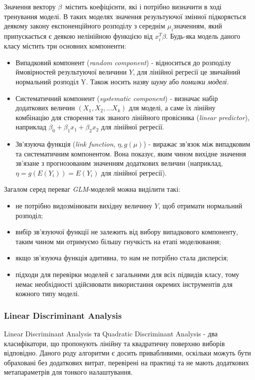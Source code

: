 Значення вектору $\beta$\ містить коефіцієнти, які і потрібно визначити в ході тренування моделі. В таких моделях значення результуючої змінної підкоряється деякому закону експоненційного розподілу з середнім $\mu_{i}$значенням, який припускається є деякою нелінійною функцією від $x_{i}^T\beta$. Будь-яка модель даного класу містить три основних компоненти:
\begin{itemize}  
	\item Випадковий компонент (\textit{random component}) - відноситься до розподілу ймовірностей результуючої величини $Y$, для лінійної регресії це звичайний нормальний розподіл {Y}. Також носить назву \textit{шуму} або \textit{помилки моделі}.
	\item Систематичний компонент (\textit{systematic component}) - визначає набір додаткових величин $(X_{1}, X_{2}, \ldots X_{k})$ для моделі, а саме їх лінійну комбінацію для створення так званого лінійного провісника (\textit{linear predictor}), наприклад $\beta_{0} + \beta_{1}x_{1} + \beta_{2}x_{2}$ для лінійної регресії.
	\item Зв'язуюча функція (\textit{link function}, $\eta, g(\mu)$) - виражає зв'язок між випадковим та систематичним компонентом. Вона показує, яким чином вихідне значення зв'язане з прогнозованим значенням додаткових величин (наприклад, $\eta = g(E(Y_{i}))=E(Y_{i})$ для лінійної регресії).
\end{itemize}

Загалом серед переваг \textit{GLM}-моделей можна виділити такі:
\begin{itemize}  
	\item не потрібно видозмінювати вихідну величину $Y$, щоб отримати нормальний розподіл;
	\item вибір зв'язуючої функції не залежить від вибору випадкового компоненту, таким чином ми отримуємо більшу гнучкість на етапі моделювання;
	\item якщо зв'язуюча функція адитивна, то нам не потрібно стала дисперсія;
	\item підходи для перевірки моделей є загальними для всіх підвидів класу, тому немає необхідності здійснювати використання окремих інструментів для кожного типу моделі.
\end{itemize}

\subsubsection{Linear Discriminant Analysis}
Linear Discriminant Analysis та Quadratic Discriminant Analysis - два класифікатори, що пропонують лінійну та квадратичну поверхню виборів відповідно. Даного роду алгоритми є досить привабливими, оскільки можуть бути обраховані без додаткових витрат, перевірені на практиці та не мають додаткових метапараметрів для тонкого налаштування.

